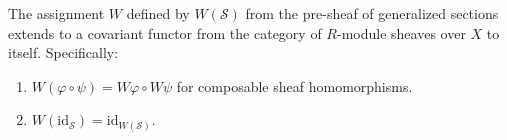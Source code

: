 The assignment $W$ defined by $W(\mathcal{S})$ from the pre-sheaf of generalized sections extends to a covariant functor from the category of $R$-module sheaves over $X$ to itself. Specifically:
\begin{enumerate}
\item $W(\varphi \circ \psi) = W\varphi \circ W\psi$ for composable sheaf homomorphisms.
\item $W(\text{id}_{\mathcal{S}}) = \text{id}_{W(\mathcal{S})}$.
\end{enumerate}
